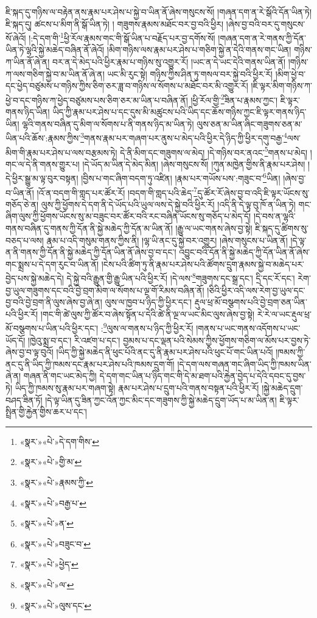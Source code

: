 ཇི་སྐད་དུ་གཉིས་ལ་བརྟེན་ནས་རྣམ་པར་ཤེས་པ་སྐྱེ་བ་ཡིན་ནོ་ཞེས་གསུངས་སོ། །གཞན་དག་ན་རེ་སྒོའི་དོན་ཡིན་ཏེ། ཇི་སྐད་དུ། ཚངས་པ་མིག་ནི་སྒོ་ཡིན་ཏེ། །
གཟུགས་རྣམས་མཐོང་བར་བྱ་བའི་ཕྱིར། །ཞེས་བྱ་བའི་བར་དུ་གསུངས་སོ་ཞེའོ། །:དེ་དག་གི་\footnote{«སྣར་»«པེ་»དེ་དག་གིས་}ཕྱི་རོལ་རྣམས་གང་གི་སྒོ་ཡིན་པ་བརྗོད་པར་བྱ་དགོས་སོ། །གཞན་དག་ན་རེ་གནས་ཀྱི་དོན་ཡིན་ཏེ་ལྷའི་སྐྱེ་མཆེད་བཞིན་ནོ་ཞེའོ། །མིག་གཉིས་ལས་རྣམ་པར་ཤེས་པ་གཅིག་སྐྱེ་ན་དེའི་གནས་གང་ཡིན། གཉིས་ཀ་ཡིན་ནོ་ཞེ་ན། བར་ན་དེ་མེད་པའི་ཕྱིར་རྣམ་པ་གཉིས་སུ་འགྱུར་རོ། །ཡང་ན་དེ་ཡང་དེའི་གནས་ཡིན་ནོ། །གཉིས་ཀ་ལས་གཅིག་སྐྱེ་བ་མ་ཡིན་ནོ་ཞེ་ན། ཡང་མི་རུང་སྟེ། གཉིས་ཀྱིས་ཤིན་ཏུ་གསལ་བར་སྐྱེ་བའི་ཕྱིར་རོ། །མིག་ཕྱེ་བ་དང་ཕྱེད་བཙུམས་པ་གཉིས་ཀྱིས་ཅིག་ཅར་ཟླ་བ་གཉིས་ལ་སོགས་པ་མཐོང་བར་མི་འགྱུར་རོ། །ཇི་ལྟར་མིག་གཉིས་ཀ་ཕྱེ་བ་དང་གཉིས་ཀ་ཕྱེད་བཙུམས་པས་ཅིག་ཅར་མ་ཡིན་པ་བཞིན་ནོ། །ཕྱི་རོལ་གྱི་\footnote{«སྣར་»«པེ་»གྱི་མ་}ཟིན་པ་རྣམས་ཀྱང་། ཇི་ལྟར་གནས་ཉིད་ཡིན། ཡིད་ཀྱི་རྣམ་པར་ཤེས་པ་དང་དུས་མི་མཚུངས་པའི་ཡིད་དང་ཆོས་གཉིས་ཀྱང་ཇི་ལྟར་གནས་ཉིད་ཡིན། ལྷའི་གནས་བཞིན་དུ་མིག་ལ་སོགས་པ་ནི་གནས་ཉིད་མ་ཡིན་ཏེ། ལུས་ཅན་མ་ཡིན་ཞིང་གཟུགས་ཅན་མ་ཡིན་པའི་ཆོས་:རྣམས་ཀྱིས་\footnote{«སྣར་»«པེ་»རྣམས་ཀྱི་}གནས་རྣམ་པར་གཞག་པར་ནུས་པ་མེད་པའི་ཕྱིར་དེ་ཉིད་ཀྱི་ཕྱིར་དགུ་བརྒྱ་\footnote{«སྣར་»«པེ་»བརྒྱ་པ་}ལས་མིག་གི་རྣམ་པར་ཤེས་པ་ལས་བརྩམས་ཏེ། དེ་ནི་མིག་དང་གཟུགས་ལ་མེད། །དེ་གཉིས་བར་ནའང་\footnote{«སྣར་»«པེ་»ན་}གནས་པ་མེད། །གང་ལ་དེ་ནི་གནས་གྱུར་པ། །དེ་ཡོད་མ་ཡིན་དེ་མེད་མིན། །ཞེས་གསུངས་སོ། །ཀུན་མཁྱེན་གྱིས་ནི་རྣམ་པར་ཤེས། །དེ་ཕྱིར་སྒྱུ་མ་ལྟ་བུར་བསྟན། །བྱིས་པ་གང་ཞིག་བདག་ཏུ་འཛིན། །རྣམ་པར་གཡོས་པས་:གཟུང་བ་\footnote{«སྣར་»«པེ་»བཟུང་བ་}ཡིན། །ཞེས་བྱ་བ་ཡིན་ནོ། །འོ་ན་བདག་གི་གླད་པར་ཚོར་རོ། །བདག་གི་གླད་པའི་ཆེད་\footnote{«སྣར་»«པེ་»ཕྱེད་}དུ་ཚོར་རོ་ཞེས་བྱ་བ་འདི་ཇི་ལྟར་ཡོངས་སུ་གཅོད་ཅེ་ན། ལུས་ཀྱི་ཕྱོགས་དེ་དག་ནི་དེ་ཡོད་པའི་ཡུལ་ལས་དེ་སྐྱེ་བའི་ཕྱིར་རོ། །འདི་ནི་དེ་ལྟ་བུ་ཁོ་ན་ཡིན་ཏེ། གང་ཞིག་ལུས་ཀྱི་ཕྱོགས་ཡོངས་སུ་མ་བཟུང་བར་ཚོར་བའི་རང་བཞིན་ཡོངས་སུ་གཅོད་པ་མེད་དོ། །དེ་བས་ན་ལྷའི་གནས་བཞིན་དུ་གནས་ཀྱི་དོན་ནི་སྐྱེ་མཆེད་ཀྱི་དོན་མ་ཡིན་ནོ། །རྒྱུ་ལ་ཡང་གནས་ཞེས་བྱ་སྟེ། ཇི་སྐད་དུ་ཚིགས་སུ་བཅད་པ་ལས། རྣམ་པ་འདི་གསུམ་གནས་ཀྱིས་ནི། །ལྷ་ཡི་ནང་དུ་སྐྱེ་བར་འགྱུར། །ཞེས་གསུངས་པ་ཡིན་ནོ། །དེ་ལྟ་ན་ནི་གནས་ཀྱི་དོན་ནི་སྐྱེ་མཆེད་ཀྱི་དོན་ཡིན་ནོ་ཞེས་བྱ་བ་དང་། འབྱུང་བའི་དོན་ནི་སྐྱེ་མཆེད་ཀྱི་དོན་ཡིན་ནོ་ཞེས་གང་སྨྲས་པ་དེ་དག་རུང་བ་ཡིན་ནོ། །ངེས་པའི་ཚིག་ཏུ་ནི་རྣམ་པར་ཤེས་པའི་ཚོགས་དྲུག་རྣམས་སྐྱེ་བ་མཆེད་པར་བྱེད་པས་སྐྱེ་མཆེད་དེ། དེ་སྐྱེ་བའི་རྒྱུན་གྱི་རྒྱུ་ཡིན་པའི་ཕྱིར་རོ། །དེ་ལས་\footnote{«སྣར་»«པེ་»ལ་}གཟུགས་དང་སྒྲ་དང་། དྲི་དང་རོ་དང་། རེག་བྱ་ཡུལ་གཟུགས་དང་བའི་བྱེ་བྲག་མིག་ལ་སོགས་པ་ལྔ་གོ་རིམས་བཞིན་ནོ། །ཅིའི་ཕྱིར་འདི་ལས་རེག་བྱ་ཡུལ་དང་བྱ་བའི་བྱེ་བྲག་ནི་ལུས་ཞེས་བྱ་ཞེ་ན། ལུས་ལ་ཁྱབ་པ་ཉིད་ཀྱི་ཕྱིར་དང་། རྡུལ་ཕྲ་མོ་བསྩགས་པའི་བྱེ་བྲག་ཅན་ཡིན་པའི་ཕྱིར་རོ། །གང་གི་ཚེ་ལུས་ཀྱི་ཚོར་བ་ཞེས་སྟོན་པ་དེའི་ཚེ་ནི་ལྔ་ལ་ཡང་མིང་ལུས་ཞེས་བྱ་སྟེ། རེ་རེ་ལ་ཡང་རྡུལ་ཕྲ་མོ་བསྩགས་པ་ཡིན་པའི་ཕྱིར་དང་། :\footnote{«སྣར་»«པེ་»ལུས་དང་}ལུས་ལ་གནས་པ་ཉིད་ཀྱི་ཕྱིར་རོ། །གནས་པ་ཡང་གནས་འདོགས་པ་ཡང་ཡོད་དོ། །ཁྱེའུ་སྨྲ་བ་དང་། རི་འཛག་པ་དང་། བྱམས་པ་དང་ལྡན་པའི་སེམས་ཀྱིས་ཕྱོགས་གཅིག་ལ་མོས་པར་བྱས་ཏེ་ཞེས་བྱ་བ་ལྟ་བུའོ། །ཡིད་ཀྱི་སྐྱེ་མཆེད་ནི་ཕུང་པོའི་ནང་དུ་ནི་རྣམ་པར་ཤེས་པའི་ཕུང་པོ་གང་ཡིན་པའོ། །ཁམས་ཀྱི་ནང་དུ་ནི་ཡིད་ཀྱི་ཁམས་དང་རྣམ་པར་ཤེས་པའི་ཁམས་དྲུག་གོ། །དེ་དག་ལས་གཞན་གང་ཞིག་ཡིད་ཀྱི་ཁམས་ཡིན་ཞེ་ན། གཞན་ནི་གང་ཡང་མེད་ཀྱི། དེ་དག་གང་ཡིན་པ་ཉིད་གང་གི་དེ་མ་ཐག་པའི་རྐྱེན་བྱེད་པ་དེའི་དབང་དུ་བྱས་ཏེ། ཡིད་ཀྱི་ཁམས་སུ་རྣམ་པར་གཞག་སྟེ། རྣམ་པར་ཤེས་པ་དྲུག་པའི་གནས་བསྟན་པའི་ཕྱིར་རོ། །སྐྱེ་མཆེད་དྲུག་བཤད་ཟིན་ཏོ། །དེ་ལྟ་ཡིན་དུ་ཟིན་ཀྱང་འོན་ཀྱང་མིང་དང་གཟུགས་ཀྱི་སྐྱེ་མཆེད་དྲུག་ཡོད་པ་མ་ཡིན་ན། ཇི་ལྟར་སྤྲིན་གྱི་རྐྱེན་གྱིས་ཆར་པ་དང་། 